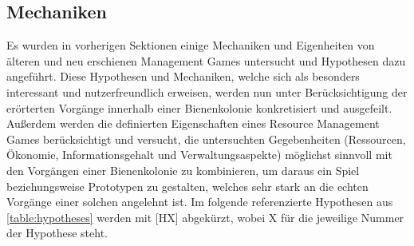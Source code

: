 \subsection{Mechaniken}
Es wurden in vorherigen Sektionen einige Mechaniken und Eigenheiten von älteren und neu erschienen Management Games untersucht und Hypothesen dazu angeführt. Diese Hypothesen und Mechaniken, welche sich als besonders interessant und nutzerfreundlich erweisen, werden nun unter Berücksichtigung der erörterten Vorgänge innerhalb einer Bienenkolonie konkretisiert und ausgefeilt. Außerdem werden die definierten Eigenschaften eines Resource Management Games berücksichtigt und versucht, die untersuchten Gegebenheiten (Ressourcen, Ökonomie, Informationsgehalt und Verwaltungsaspekte) möglichst sinnvoll mit den Vorgängen einer Bienenkolonie zu kombinieren, um daraus ein Spiel beziehungsweise Prototypen zu gestalten, welches sehr stark an die echten Vorgänge einer solchen angelehnt ist. Im folgende referenzierte Hypothesen aus \autoref{table:hypotheses} werden mit [HX] abgekürzt, wobei X für die jeweilige Nummer der Hypothese steht.

